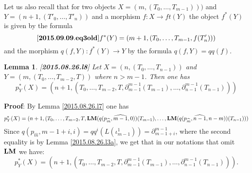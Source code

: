 \documentclass[11pt]{article}
\newenvironment{eq}{\begin{equation}}{\end{equation}}
\newenvironment{proof}{{\bf Proof}:}{\vskip 5mm }
\newtheorem{lemma}[proposition]{Lemma}
\newcommand{\llabel}[1]{\label{#1}[{\bf #1}]}
\newcommand{\sr}{\rightarrow}
\newcommand{\wh}{\widehat}
\newcommand{\LM}{{\bf LM}}
\begin{document}
Let us also recall that for two objects $X=(m,(T_0,\dots,T_{m-1})))$ and $Y=(n+1,(T'_0,\dots,T'_{n}))$ and a morphism $f:X\sr ft(Y)$ the object $f^*(Y)$ is given by the formula
%
\begin{eq}\llabel{2015.09.09.eq3old}
f^*(Y)=(m+1,(T_0,\dots,T_{m-1},f(T'_{n})))
\end{eq}
%
and the morphism $q(f,Y):f^*(Y)\sr Y$ by the formula $q(f,Y)=qq(f)$. 
% 
\begin{lemma}
\llabel{2015.08.26.l8}
Let $X=(n,(T_0,\dots,T_{n-1}))$ and $Y=(m,(T_0,\dots,T_{m-2},T))$ where $n>m-1$. Then one has
%
$$p_{Y}^*(X)=(n+1,(T_0,\dots,T_{m-2},T,\partial_{m-1}^{m-1}(T_{m-1}),\dots,\partial_{n-1}^{m-1}(T_{n-1})))$$
%
\end{lemma}
%
\begin{proof}
By Lemma \ref{2015.08.26.l7} one has
%
$$p_{Y}^*(X)=(n+1,(T_0,\dots,T_{m-2},T, \LM(q(p_{\wh{m}},\wh{m-1},0))(T_{m-1}),\dots,\LM(q(p_{\wh{m}},\wh{n-1},n-m))(T_{n-1})))$$
%
Since $q(p_{\wh{m}},m-1+i,i)=qq^i(L(\iota_{m-1}^1))=\partial^{m-1}_{m-1+i}$, where the second equality is by Lemma \ref{2015.08.26.l3a}, we get that in our notations that omit $\LM$ we have:
%
$$p_{Y}^*(X)=(n+1,(T_0,\dots,T_{m-2},T,\partial^{m-1}_{m-1}(T_{m-1}),\dots,\partial^{m-1}_{n-1}(T_{n-1}))).$$
%
\end{proof}
%
\end{document}
